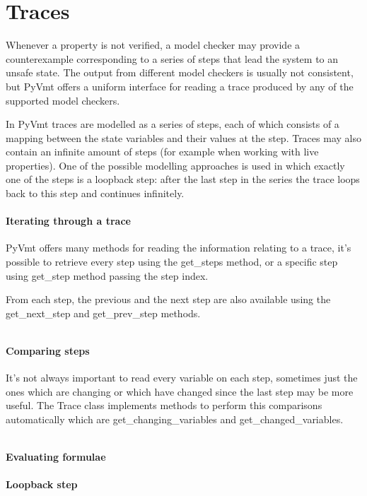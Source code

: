\section{Traces}
Whenever a property is not verified, a model checker may provide a counterexample corresponding to a series of steps that lead the system to an unsafe state.
The output from different model checkers is usually not consistent, but PyVmt offers a uniform interface for reading a trace produced by any of the supported model checkers.

In PyVmt traces are modelled as a series of steps, each of which consists of a mapping between the state variables and their values at the step.
Traces may also contain an infinite amount of steps (for example when working with live properties).
One of the possible modelling approaches is used in which exactly one of the steps is a loopback step: after the last step in the series the trace loops back to this step and continues infinitely.

\paragraph*{Iterating through a trace}
PyVmt offers many methods for reading the information relating to a trace, it's possible to retrieve every step using the get\_steps method, or a specific step using get\_step method passing the step index.

From each step, the previous and the next step are also available using the get\_next\_step and get\_prev\_step methods.

\inputminted[firstline=22, lastline=39]{python3}{py/model_checking.py}

\paragraph*{Comparing steps}
It's not always important to read every variable on each step, sometimes just the ones which are changing or which have changed since the last step may be more useful.
The Trace class implements methods to perform this comparisons automatically which are get\_changing\_variables and get\_changed\_variables.

\inputminted[firstline=41, lastline=48]{python3}{py/model_checking.py}

\paragraph*{Evaluating formulae}

\paragraph*{Loopback step}

